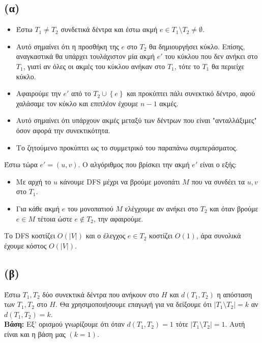 		\subsection*{(α)}
			\begin{itemize}
				\item Έστω $T_1 \neq T_2$ συνδετικά δέντρα και έστω ακμή $e \in T_1 \setminus T_2 \neq \emptyset $. 
				\item Αυτό σημαίνει ότι η προσθήκη της $e$ στο $T_2$ θα δημιουργήσει κύκλο. Επίσης, αναγκαστικά θα υπάρχει τουλάχιστον μία ακμή $e'$ του κύκλου που δεν ανήκει στο $T_1$, γιατί αν όλες οι ακμές του κύκλου ανήκαν στο $T_1$, τότε το $T_1$ θα περιείχε κύκλο. 
				\item Αφαιρούμε την $e'$ από το $Τ_2 \cup \left\{e\right\}$ και προκύπτει πάλι συνεκτικό δέντρο, αφού χαλάσαμε τον κύκλο και επιπλέον έχουμε $n-1$ ακμές.
				\item Αυτό σημαίνει ότι υπάρχουν ακμές μεταξύ των δέντρων που είναι "ανταλλάξιμες" όσον αφορά την συνεκτικότητα.
				\item Το ζητούμενο προκύπτει ως το συμμετρικό του παραπάνω συμπεράσματος.  
			\end{itemize}
			
			
			Έστω τώρα $e' = (u, v)$. Ο αλγόριθμος που βρίσκει την ακμή $e'$ είναι ο εξής: 
			
			\begin{itemize}
				\item Με αρχή το $u$ κάνουμε DFS μέχρι να βρούμε μονοπάτι $M$ που να συνδέει τα $u, v$ στο $T_1$.
				\item Για κάθε ακμή $e$ του μονοπατιού $M$ ελέγχουμε αν ανήκει στο $T_2$ και όταν βρούμε $e \in M$ τέτοια ώστε $e \notin T_2$, την αφαιρούμε. 
			\end{itemize} 	
		
			Το DFS κοστίζει $O(|V|)$ και ο έλεγχος $e \in T_2$ κοστίζει $O(1)$, άρα συνολικά έχουμε κόστος $O(|V|)$.
			
		\subsection*{(β)}
			Έστω $T_1, T_2$ δύο συνεκτικά δέντρα που ανήκουν στο $H$ και $d(T_1, T_2)$ η απόσταση των $T_1, T_2$ στο $H$. Θα χρησιμοποιήσουμε επαγωγή για να δείξουμε ότι $|Τ_1 \setminus Τ_2| = k$ αν $d(T_1, T_2) = k$. \\
			
			\textbf{Βάση:} Εξ' ορισμού γνωρίζουμε ότι όταν $d(T_1, T_2) = 1$ τότε $|T_1 \setminus T_2| = 1$. Αυτή είναι και η βάση μας $(k = 1)$. \\ 
			
